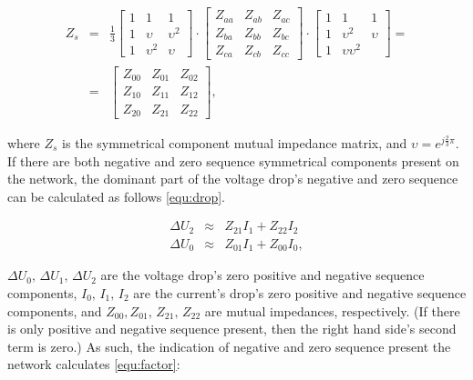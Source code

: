             \begin{equation}
                \begin{array}{rcl}
                       Z_s&=&\frac{1}{3}\begin{bmatrix} 1&1&1\\1&\upsilon&\upsilon^2\\1&\upsilon^2&\upsilon \end{bmatrix}\cdot
                                        \begin{bmatrix} Z_{aa}&Z_{ab}&Z_{ac}\\Z_{ba}&Z_{bb}&Z_{bc}\\Z_{ca}&Z_{cb}&Z_{cc} \end{bmatrix}\cdot
                                        \begin{bmatrix} 1&1&1\\1&\upsilon^2&\upsilon\\1&\upsilon\upsilon^2\end{bmatrix}=\\
                          &=&  \begin{bmatrix} Z_{00}&Z_{01}&Z_{02}\\Z_{10}&Z_{11}&Z_{12}\\Z_{20}&Z_{21}&Z_{22} \end{bmatrix},

                \end{array}
                \label{equ:mutual}
            \end{equation}

where $Z_s$ is the symmetrical component mutual impedance matrix, and $\upsilon=e^{j\frac{2}{3}\pi}$. If there are both negative and zero sequence symmetrical components present on the network, the dominant part of the voltage drop's negative and zero sequence can be calculated as follows \ref{equ:drop}.

            \begin{equation}
                \begin{array}{rcl}
                       \Delta U_2&\approx&Z_{21}I_1+Z_{22}I_2\\
                       \Delta U_0&\approx&Z_{01}I_1+Z_{00}I_0,
                \end{array}
                \label{equ:drop}
            \end{equation}

$\Delta U_0,\,\Delta U_1,\,\Delta U_2$ are the voltage drop's zero positive and negative sequence components, $I_0,\,I_1,\,I_2$ are the current's drop's zero positive and negative sequence components, and $Z_{00},Z_{01},\,Z_{21},\,Z_{22}$ are mutual impedances,  respectively. (If there is only positive and negative sequence present, then the right hand side's second term is zero.) As such, the indication of negative and zero sequence present the network calculates \ref{equ:factor}:

